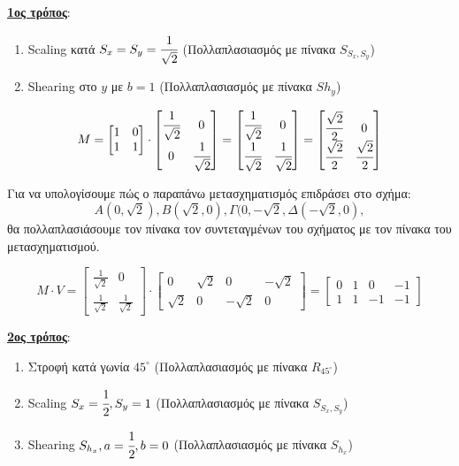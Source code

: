 \begin{solution}

\textbf{\underline{1ος τρόπος}}: 

\begin{enumerate}
	  \item Scaling κατά $S_x = S_y = \cfrac{1}{\sqrt{2}}$ (Πολλαπλασιασμός με πίνακα $S_{S_x, S_y}$)
	  \item Shearing στο $y$ με $b=1$ (Πολλαπλασιασμός με πίνακα $Sh_y$)
\end{enumerate}

\[
	M = 
		\begin{bmatrix}
			1 & 0 \\
			1 & 1
		\end{bmatrix}
	\cdot
		\begin{bmatrix}
			\cfrac{1}{\sqrt{2}} & 0 \\
			0 & \cfrac{1}{\sqrt{2}}
		\end{bmatrix}
	=	
		\begin{bmatrix}
			\cfrac{1}{\sqrt{2}} & 0 \\
			 \cfrac{1}{\sqrt{2}} & \cfrac{1}{\sqrt{2}}
		\end{bmatrix}
	=
	\begin{bmatrix}
			\cfrac{\sqrt{2}}{2} & 0 \\
			 \cfrac{\sqrt{2}}{2} & \cfrac{\sqrt{2}}{2}
		\end{bmatrix}	
\]

Για να υπολογίσουμε πώς ο παραπάνω μετασχηματισμός επιδράσει στο σχήμα: 
\[
	A (0, \sqrt{2}), B(\sqrt{2},0), \Gamma (0, -\sqrt{2}, \Delta(-\sqrt{2},0),
\]	
θα πολλαπλασιάσουμε τον πίνακα τον συντεταγμένων του σχήματος με τον πίνακα του μετασχηματισμού.

\[
M \cdot V = 
	\begin{bmatrix}
		\frac{1}{\sqrt{2}} & 0 \\
		\frac{1}{\sqrt{2}} & \frac{1}{\sqrt{2}} 
	\end{bmatrix}
\cdot 
	\begin{bmatrix}
		0 & \sqrt{2} & 0 & -\sqrt{2} \\
		\sqrt{2} & 0 & -\sqrt{2} & 0 
	\end{bmatrix}
	=
	\begin{bmatrix}
		0 & 1 & 0 & -1 \\
		1 & 1 & -1 & -1
	\end{bmatrix}	
\]


\textbf{\underline{2ος τρόπος}}: 

\begin{enumerate}
	  \item Στροφή κατά γωνία $45^\circ$ (Πολλαπλασιασμός με πίνακα $R_{45^\circ}$)
	  \item Scaling $S_x = \cfrac{1}{2}, S_y  = 1$ (Πολλαπλασιασμός με πίνακα $S_{S_x, S_y}$)
	  \item Shearing $S_{h_x}, a = \cfrac{1}{2}, b=0$ (Πολλαπλασιασμός με πίνακα $S_{h_x}$) 
\end{enumerate}


\end{solution}
